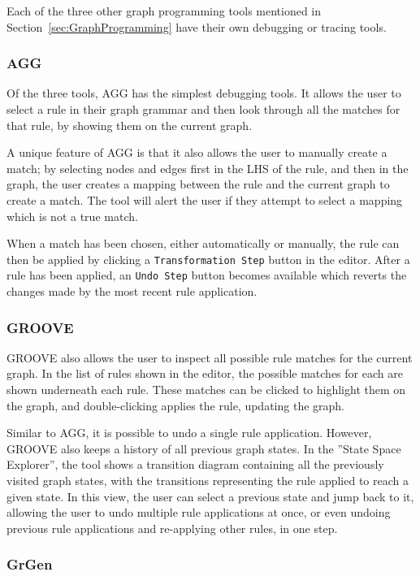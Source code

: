 \documentclass[authoryearcitations]{UoYCSproject}
\begin{document}
Each of the three other graph programming tools mentioned in
Section~\ref{sec:GraphProgramming} have their own debugging or tracing tools.

\subsubsection{AGG}

Of the three tools, AGG has the simplest debugging tools. It allows the user to
select a rule in their graph grammar and then look through all the matches for
that rule, by showing them on the current graph.

A unique feature of AGG is that it also allows the user to manually create a
match; by selecting nodes and edges first in the LHS of the rule, and then in
the graph, the user creates a mapping between the rule and the current graph to
create a match. The tool will alert the user if they attempt to select a mapping
which is not a true match.

When a match has been chosen, either automatically or manually, the rule can then
be applied by clicking a \texttt{Transformation Step} button in the editor. After
a rule has been applied, an \texttt{Undo Step} button becomes available which
reverts the changes made by the most recent rule application.

\subsubsection{GROOVE}

GROOVE also allows the user to inspect all possible rule matches for the current
graph. In the list of rules shown in the editor, the possible matches for each are
shown underneath each rule. These matches can be clicked to highlight them on the
graph, and double-clicking applies the rule, updating the graph.

Similar to AGG, it is possible to undo a single rule application. However, GROOVE
also keeps a history of all previous graph states. In the ''State Space Explorer'',
the tool shows a transition diagram containing all the previously visited graph
states, with the transitions representing the rule applied to reach a given state.
In this view, the user can select a previous state and jump back to it, allowing
the user to undo multiple rule applications at once, or even undoing previous rule
applications and re-applying other rules, in one step.

\subsubsection{GrGen}
\end{document}
